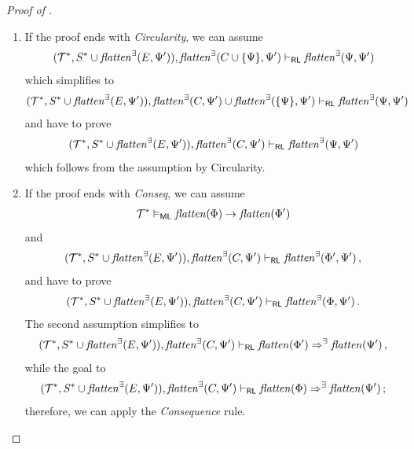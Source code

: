 \begin{proof}[Proof of ]
\begin{enumerate}
    \item If the proof ends with \emph{Circularity}, we can assume
        \begin{align*}
            (\mathcal{T}^*, S^* \cup \mathit{flatten}^\exists(E, \Psi^\prime)),
            \mathit{flatten}^\exists(C \cup \{ \Psi \}, \Psi^\prime) \vdash_{\mathsf{RL}}
            \mathit{flatten}^\exists(\Psi, \Psi^\prime)
        \end{align*}
        which simplifies to
        \begin{align*}
            (\mathcal{T}^*, S^* \cup \mathit{flatten}^\exists(E, \Psi^\prime)),
            \mathit{flatten}^\exists(C, \Psi^\prime) \cup \mathit{flatten}^\exists(\{ \Psi \}, \Psi^\prime) \vdash_{\mathsf{RL}}
            \mathit{flatten}^\exists(\Psi, \Psi^\prime)
        \end{align*}
        and have to prove
        \begin{align*}
            (\mathcal{T}^*, S^* \cup \mathit{flatten}^\exists(E, \Psi^\prime)),
            \mathit{flatten}^\exists(C, \Psi^\prime) \vdash_{\mathsf{RL}}
            \mathit{flatten}^\exists(\Psi, \Psi^\prime)
        \end{align*}
        which follows from the assumption by Circularity.
        
    \item If the proof ends with \emph{Conseq}, we can assume
    \begin{align*}
        \mathcal{T}^* \vDash_{\mathsf{ML}} \mathit{flatten}(\Phi) \rightarrow \mathit{flatten}(\Phi^\prime)
    \end{align*}
    and
    \begin{align*}
        (\mathcal{T}^*, S^* \cup \mathit{flatten}^\exists(E, \Psi^\prime)), \mathit{flatten}^\exists(C, \Psi^\prime) \vdash_{\mathsf{RL}}
          \mathit{flatten}^\exists(\Phi^\prime, \Psi^\prime) \, ,
    \end{align*}
    and have to prove
    \begin{align*}
        (\mathcal{T}^*, S^* \cup \mathit{flatten}^\exists(E, \Psi^\prime)), \mathit{flatten}^\exists(C, \Psi^\prime) \vdash_{\mathsf{RL}}
          \mathit{flatten}^\exists(\Phi, \Psi^\prime)  \, .
    \end{align*}
    The second assumption simplifies to
    \begin{align*}
        (\mathcal{T}^*, S^* \cup \mathit{flatten}^\exists(E, \Psi^\prime)), \mathit{flatten}^\exists(C, \Psi^\prime) \vdash_{\mathsf{RL}}
          \mathit{flatten}(\Phi^\prime) \Rightarrow^\exists \mathit{flatten}(\Psi^\prime) \, ,
    \end{align*}
    while the goal to
    \begin{align*}
        (\mathcal{T}^*, S^* \cup \mathit{flatten}^\exists(E, \Psi^\prime)), \mathit{flatten}^\exists(C, \Psi^\prime) \vdash_{\mathsf{RL}}
          \mathit{flatten}(\Phi) \Rightarrow^\exists \mathit{flatten}(\Psi^\prime) \, ;
    \end{align*}
    therefore, we can apply the \emph{Consequence} rule.        
        

\end{enumerate}
\end{proof}
